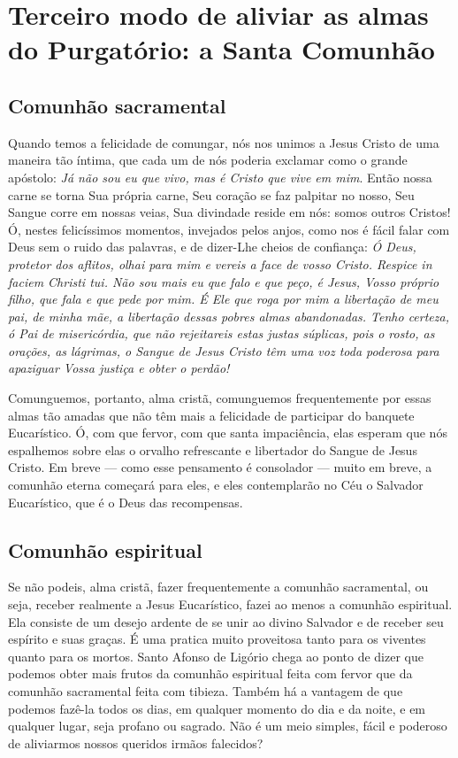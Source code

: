 \renewcommand{\thechapterdisplay}{Vigésimo segundo dia}
\renewcommand{\thechapterrunner}{Terceiro modo: a Santa Comunhão}
\chapter[Vigésimo segundo dia --- Terceiro modo de aliviar as almas do Purgatório: a Santa Comunhão]{Terceiro modo de aliviar as almas do Purgatório: a Santa Comunhão}
\section*{Comunhão sacramental}

Quando temos a felicidade de comungar, nós nos unimos a Jesus Cristo de uma maneira tão íntima, que cada um de nós poderia exclamar como o grande apóstolo: \textit{Já não sou eu que vivo, mas é Cristo que vive em mim}. Então nossa carne se torna Sua própria carne, Seu coração se faz palpitar no nosso, Seu Sangue corre em nossas veias, Sua divindade reside em nós: somos outros Cristos! Ó, nestes felicíssimos momentos, invejados pelos anjos, como nos é fácil falar com Deus sem o ruido das palavras, e de dizer-Lhe cheios de confiança: \textit{Ó Deus, protetor dos aflitos, olhai para mim e vereis a face de vosso Cristo. Respice in faciem Christi tui. Não sou mais eu que falo e que peço, é Jesus, Vosso próprio filho, que fala e que pede por mim. É Ele que roga por mim a libertação de meu pai, de minha mãe, a libertação dessas pobres almas abandonadas. Tenho certeza, ó Pai de misericórdia, que não rejeitareis estas justas súplicas, pois o rosto, as orações, as lágrimas, o Sangue de Jesus Cristo têm uma voz toda poderosa para apaziguar Vossa justiça e obter o perdão!}

Comunguemos, portanto, alma cristã, comunguemos frequentemente por essas almas tão amadas que não têm mais a felicidade de participar do banquete Eucarístico. Ó, com que fervor, com que santa impaciência, elas esperam que nós espalhemos sobre elas o orvalho refrescante e libertador do Sangue de Jesus Cristo. Em breve --- como esse pensamento é consolador --- muito em breve, a comunhão eterna começará para eles, e eles contemplarão no Céu o Salvador Eucarístico, que é o Deus das recompensas. 


\section*{Comunhão espiritual}

Se não podeis, alma cristã, fazer frequentemente a comunhão sacramental, ou seja, receber realmente a Jesus Eucarístico, fazei ao menos a comunhão espiritual. Ela consiste de um desejo ardente de se unir ao divino Salvador e de receber seu espírito e suas graças. É uma pratica muito proveitosa tanto para os viventes quanto para os mortos. Santo Afonso de Ligório chega ao ponto de dizer que podemos obter mais frutos da comunhão espiritual feita com fervor que da comunhão sacramental feita com tibieza. Também há a vantagem de que podemos fazê-la todos os dias, em qualquer momento do dia e da noite, e em qualquer lugar, seja profano ou sagrado. Não é um meio simples, fácil e poderoso de aliviarmos nossos queridos irmãos falecidos?

